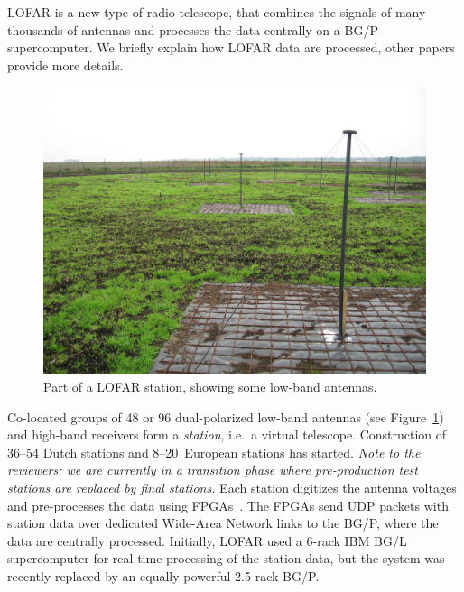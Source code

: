 \documentclass[journal]{IEEEtran}
\begin{document}
LOFAR is a new type of radio telescope, that combines the signals of many
thousands of antennas and processes the data centrally on a BG/P supercomputer.
We briefly explain how LOFAR data are processed, other papers provide more
details\cite{Romein:06,Iskra:08}.


\addtocounter{figure}{-2}
\begin{figure}[h]
\begin{center}
\includegraphics[width=.7\columnwidth]{station.jpg}
\end{center}
\caption{Part of a LOFAR station, showing some low-band antennas.}
\label{fig:station}
\end{figure}
\addtocounter{figure}{1}

Co-located groups of 48 or 96 dual-polarized low-band antennas (see
Figure~\ref{fig:station}) and high-band receivers form a \emph{station},
i.e.\ a virtual telescope.
Construction of 36--54 Dutch stations and 8--20~European stations has started.
\emph{Note to the reviewers: we are currently in a transition phase
where pre-production test stations are replaced by final stations.}
Each station digitizes the antenna voltages and pre-processes the data using
FPGAs~\cite{Gunst:07}.
The FPGAs send UDP packets with station data over dedicated Wide-Area
Network links to the BG/P, where the data are centrally processed.
Initially, LOFAR used a 6-rack IBM BG/L supercomputer for real-time
processing of the station data, but the system was recently replaced by an
equally powerful 2.5-rack BG/P.
\end{document}
